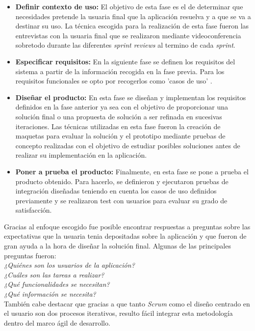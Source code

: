 \documentclass[11pt,a4paper]{article}
\begin{document}
\begin{itemize}
\item \textbf{Definir contexto de uso:} El objetivo de esta fase es el de determinar que necesidades pretende la usuaria final que la aplicación resuelva y a que se va a destinar su uso. La técnica escogida para la realización de esta fase fueron las entrevistas con la usuaria final que se realizaron mediante videoconferencia sobretodo durante las diferentes \textit{sprint reviews} al termino de cada \textit{sprint}.
\item \textbf{Especificar requisitos:} En la siguiente fase se definen los requisitos del sistema a partir de la información recogida en la fase previa. Para los requisitos funcionales se opto por recogerlos como 'casos de uso' \cite{16}.
\item \textbf{Diseñar el producto:} En esta fase se diseñan y implementan los requisitos definidos en la fase anterior ya sea con el objetivo de proporcionar una solución final o una propuesta de solución a ser refinada en sucesivas iteraciones. Las técnicas utilizadas en esta fase fueron la creación de maquetas para evaluar la solución y el prototipo mediante pruebas de concepto realizadas con el objetivo de estudiar posibles soluciones antes de realizar su implementación en la aplicación.
\item \textbf{Poner a prueba el producto:} Finalmente, en esta fase se pone a prueba el producto obtenido. Para hacerlo, se definieron y ejecutaron pruebas de integración diseñadas teniendo en cuenta los casos de uso definidos previamente y se realizaron test con usuarios para evaluar su grado de satisfacción.
\end{itemize}

Gracias al enfoque escogido fue posible encontrar respuestas a preguntas sobre las expectativas que la usuaria tenia depositadas sobre la aplicación y que fueron de gran ayuda a la hora de diseñar la solución final. Algunas de las principales preguntas fueron:\\
\textit{¿Quiénes son los usuarios de la aplicación?}\\
\textit{¿Cuáles son las tareas a realizar?}\\
\textit{¿Qué funcionalidades se necesitan?}\\
\textit{¿Qué información se necesita?}
\\

También cabe destacar que gracias a que tanto \textit{Scrum} como el diseño centrado en el usuario son dos procesos iterativos, resulto fácil integrar esta metodología dentro del marco ágil de desarrollo.
\medskip 
\end{document}
